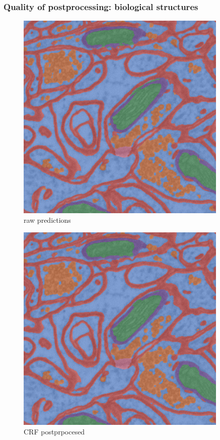 \documentclass{beamer}
\begin{document}
\begin{frame}
    \frametitle{Quality of postprocessing: biological structures}
    \begin{minipage}{0.49\textwidth}
        \begin{figure}
            \includegraphics[width=0.9\textwidth]{raw_pred.png}
            \caption{raw predictions}
        \end{figure}
    \end{minipage}
    \begin{minipage}{0.49\textwidth}
        \begin{figure}
            \includegraphics[width=0.9\textwidth]{crf_pred.png}
            \caption{CRF postprpocesed}
        \end{figure}
    \end{minipage}
\end{frame}
\end{document}
